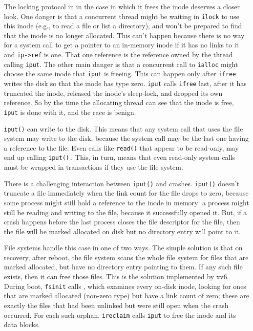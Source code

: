 The locking protocol in 
in the case in which it frees the inode deserves a closer look.
One danger is that a concurrent thread might be waiting in
\lstinline{ilock}
to use this inode (e.g., to read a file or list a directory),
and won't be prepared to find that the inode is no longer
allocated. This can't happen because there is no way for
a system call to get a pointer to an in-memory inode if it has
no links to it and 
\lstinline{ip->ref}
is one. That one reference is the reference owned by the
thread calling
\lstinline{iput}.
The other main danger is that a concurrent call to
\lstinline{ialloc}
might choose the same inode that
\lstinline{iput}
is freeing.
This can happen only after
\lstinline{ifree}
writes the disk so that the inode has type zero.
\lstinline{iput}
calls
\lstinline{ifree}
last, after it has truncated the inode, released the inode's
sleep-lock, and dropped its own reference.
So by the time the allocating thread can see that the inode is free,
\lstinline{iput}
is done with it, and the race is benign.

\lstinline{iput()}
can write to the disk.  This means that any system call that uses the file
system may write to the disk, because the system call may be the last one having
a reference to the file. Even calls like
\lstinline{read()}
that appear to be read-only, may end up calling
\lstinline{iput().}
This, in turn, means that even read-only system calls
must be wrapped in transactions if they use the file system.

There is a challenging interaction between
\lstinline{iput()}
and crashes.
\lstinline{iput()}
doesn't truncate a file immediately when the link count for the file
drops to zero, because some process might still hold a reference to the inode in
memory: a process might still be reading and writing to the file, because it
successfully opened it. But, if a crash happens before the last process closes
the file descriptor for the file, then the file will be marked allocated on disk
but no directory entry will point to it.

File systems handle this case in one of two ways. The simple solution is that on
recovery, after reboot, the file system scans the whole file system for files
that are marked allocated, but have no directory entry pointing to them.  If any
such file exists, then it can free those files.  This is the solution implemented
by xv6.  During boot,
\lstinline{fsinit}
calls
,
which examines every on-disk inode, looking for ones that are marked
allocated (non-zero type) but have a link count of zero; these are
exactly the files that had been unlinked but were still open when
the crash occurred.
For each such orphan,
\lstinline{ireclaim} calls \lstinline{iput}
to free the inode and its data blocks.

